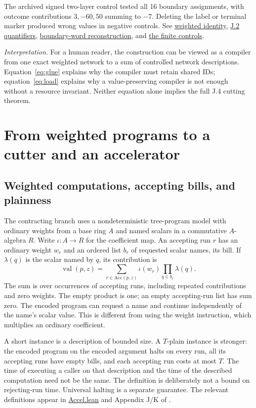 \documentclass[11pt,letterpaper]{article}
\theoremstyle{definition}\newtheorem{definition}[theorem]{Definition}\newtheorem{example}[theorem]{Example}
\theoremstyle{remark}\newtheorem{remark}[theorem]{Remark}
\newcommand{\pub}[3]{\href{https://github.com/anthropics/formal-math/blob/11b6c7e3c927df2658f513b6b68ea7f8929c62c5/vp-vnp/#1\#L#2}{#3}}
\newcommand{\aud}[2]{\href{https://github.com/nousentllc/VP-VNP-Review/blob/567303d0bcf4f9d54390437b137752446e58ccd6/#1}{#2}}
\newcommand{\interpret}[1]{\par\smallskip\noindent\textit{Interpretation.} #1\par\smallskip}
\begin{document}
The archived signed two-layer control tested all 16 boundary assignments, with outcome contributions $3,-60,50$ summing to $-7$. Deleting the label or terminal marker produced wrong values in negative controls. See \pub{Paper/Tree.lean}{1102}{weighted identity}, \pub{Paper/Pieces.lean}{640}{J.2 quantifiers}, \aud{passes/11c-piece-decomposition.md}{boundary-word reconstruction}, and \aud{passes/14b-tower.md}{the finite controls}.
\interpret{For a human reader, the construction can be viewed as a compiler from one exact weighted network to a sum of controlled network descriptions. Equation~\eqref{eq:glue} explains why the compiler must retain shared IDs; equation~\eqref{eq:load} explains why a value-preserving compiler is not enough without a resource invariant. Neither equation alone implies the full J.4 cutting theorem.}

\section{From weighted programs to a cutter and an accelerator}\label{sec:machine}
\subsection{Weighted computations, accepting bills, and plainness}\label{sec:plain}
The contracting branch uses a nondeterministic tree-program model with ordinary weights from a base ring $A$ and named scalars in a commutative $A$-algebra $R$. Write $\iota:A\to R$ for the coefficient map. An accepting run $r$ has an ordinary weight $w_r$ and an ordered list $b_r$ of requested scalar names, its bill. If $\lambda(q)$ is the scalar named by $q$, its contribution is
\begin{equation}\label{eq:value}
 \operatorname{val}(p,z)=\sum_{r\in\mathrm{Acc}(p,z)}\iota(w_r)\prod_{q\in b_r}\lambda(q).
\end{equation}
The sum is over occurrences of accepting runs, including repeated contributions and zero weights. The empty product is one; an empty accepting-run list has sum zero. The encoded program can request a name and continue independently of the name's scalar value. This is different from using the weight instruction, which multiplies an ordinary coefficient.

A short instance is a description of bounded size. A $T$-plain instance is stronger: the encoded program on the encoded argument halts on every run, all its accepting runs have empty bills, and each accepting run costs at most $T$. The time of executing a caller on that description and the time of the described computation need not be the same. The definition is deliberately not a bound on rejecting-run time. Universal halting is a separate guarantee. The relevant definitions appear in \pub{NS1/Accel.lean}{23}{Accel.lean} and Appendix J/K of \cite{claude}.
\end{document}
